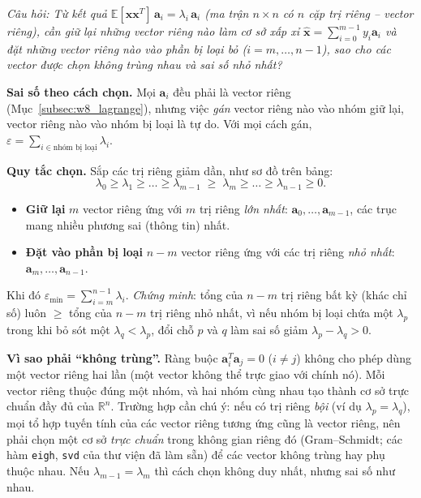 \textit{Câu hỏi: Từ kết quả $\mathbb{E}[\mathbf{x}\mathbf{x}^T]\,\mathbf{a}_i = \lambda_i\,\mathbf{a}_i$ (ma trận $n \times n$ có $n$ cặp trị riêng -- vector riêng), cần giữ lại những vector riêng nào làm cơ sở xấp xỉ $\hat{\mathbf{x}} = \sum_{i=0}^{m-1}y_i\mathbf{a}_i$ và đặt những vector riêng nào vào phần bị loại bỏ ($i = m, \ldots, n - 1$), sao cho các vector được chọn không trùng nhau và sai số nhỏ nhất?}


\textbf{Sai số theo cách chọn.} Mọi $\mathbf{a}_i$ đều phải là vector riêng (Mục~\ref{subsec:w8_lagrange}), nhưng việc \emph{gán} vector riêng nào vào nhóm giữ lại, vector riêng nào vào nhóm bị loại là tự do. Với mọi cách gán, $\varepsilon = \sum_{i \in \text{nhóm bị loại}}\lambda_i$.

\textbf{Quy tắc chọn.} Sắp các trị riêng giảm dần, như sơ đồ trên bảng:
\begin{equation}
\lambda_0 \ge \lambda_1 \ge \ldots \ge \lambda_{m-1} \;\ge\; \lambda_m \ge \ldots \ge \lambda_{n-1} \ge 0.
\end{equation}
\begin{itemize}
    \item \textbf{Giữ lại} $m$ vector riêng ứng với $m$ trị riêng \emph{lớn nhất}: $\mathbf{a}_0, \ldots, \mathbf{a}_{m-1}$, các trục mang nhiều phương sai (thông tin) nhất.
    \item \textbf{Đặt vào phần bị loại} $n - m$ vector riêng ứng với các trị riêng \emph{nhỏ nhất}: $\mathbf{a}_m, \ldots, \mathbf{a}_{n-1}$.
\end{itemize}
Khi đó $\varepsilon_{\min} = \sum_{i=m}^{n-1}\lambda_i$. \emph{Chứng minh}: tổng của $n - m$ trị riêng bất kỳ (khác chỉ số) luôn $\ge$ tổng của $n - m$ trị riêng nhỏ nhất, vì nếu nhóm bị loại chứa một $\lambda_p$ trong khi bỏ sót một $\lambda_q < \lambda_p$, đổi chỗ $p$ và $q$ làm sai số giảm $\lambda_p - \lambda_q > 0$.

\textbf{Vì sao phải ``không trùng''.} Ràng buộc $\mathbf{a}_i^T\mathbf{a}_j = 0$ ($i \ne j$) không cho phép dùng một vector riêng hai lần (một vector không thể trực giao với chính nó). Mỗi vector riêng thuộc đúng một nhóm, và hai nhóm cùng nhau tạo thành cơ sở trực chuẩn đầy đủ của $\mathbb{R}^n$. Trường hợp cần chú ý: nếu có trị riêng \emph{bội} (ví dụ $\lambda_p = \lambda_q$), mọi tổ hợp tuyến tính của các vector riêng tương ứng cũng là vector riêng, nên phải chọn một cơ sở \emph{trực chuẩn} trong không gian riêng đó (Gram--Schmidt; các hàm \texttt{eigh}, \texttt{svd} của thư viện đã làm sẵn) để các vector không trùng hay phụ thuộc nhau. Nếu $\lambda_{m-1} = \lambda_m$ thì cách chọn không duy nhất, nhưng sai số như nhau.

